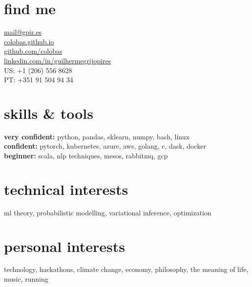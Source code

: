 \documentclass[]{colobas-cv}
\begin{document}

\begin{minipage}[t]{0.3\textwidth}
\section{find me}
  \vspace{7pt}
  \href{mailto:mail@gpir.es}{mail@gpir.es}\\
  \href{https://colobas.github.io}{colobas.github.io}\\
  \href{https://github.com/colobas}{github.com/colobas}\\
  \href{https://linkedin.com/in/guilhermegrijopires/}{linkedin.com/in/guilhermegrijopires}\\
  US: +1 (206) 556 8628\\
  PT: +351 91 504 94 34%
\end{minipage}
\hfill
\begin{minipage}[t]{0.3\textwidth}
\section{skills \& tools}
  \vspace{7pt}
  \textbf{very confident:} python, pandas, sklearn, numpy, bash, linux\\
  \textbf{confident:} pytorch, kubernetes, azure, aws, golang, c, dask, docker\\
  \textbf{beginner:} scala, nlp techniques, mesos, rabbitmq, gcp%
\end{minipage}
\hfill
\begin{minipage}[t]{0.3\textwidth}
\section{technical interests}
  \vspace{7pt}
  ml theory, probabilistic modelling, variational inference, optimization%
  \vspace{15pt}
\section{personal interests}
  \vspace{7pt}
  technology, hackathons, climate change, economy, philosophy, the meaning of life,
  music, running
\end{minipage}

\vspace{0.5cm}
\end{document}
